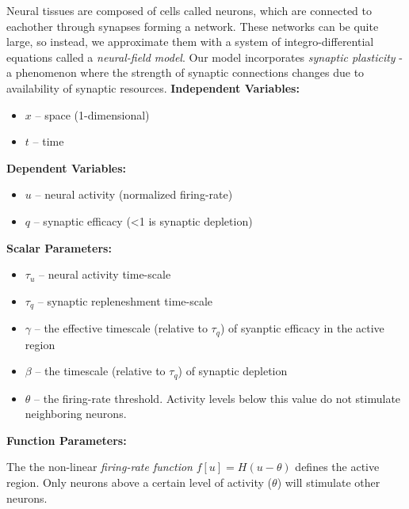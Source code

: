 \documentclass[landscape,final]{baposter}
\begin{document}
\begin{poster}

{
	Neural tissues are composed of cells called neurons, which are connected to eachother through synapses forming a network. These networks can be quite large, so instead, we approximate them with a system of integro-differential equations called a \textit{neural-field model}. Our model incorporates \textit{synaptic plasticity} - a phenomenon where the strength of synaptic connections changes due to availability of synaptic resources.
	\textbf{Independent Variables:}
	\begin{itemize}
		\item $x$ -- space (1-dimensional)
		\item $t$ -- time
	\end{itemize}
	\textbf{Dependent Variables:}
		\begin{itemize}
		\item $u$ -- neural activity (normalized firing-rate)
		\item $q$ -- synaptic efficacy (<1 is synaptic depletion)
	\end{itemize}
	\textbf{Scalar Parameters:}
		\begin{itemize}
		\item $\tau_u$ -- neural activity time-scale
		\item $\tau_q$ -- synaptic repleneshment time-scale
		\item $\gamma$ -- the effective timescale (relative to $\tau_q$) of syanptic efficacy in the active region
		\item $\beta$ -- the timescale (relative to $\tau_q$) of synaptic depletion
		\item $\theta$ -- the firing-rate threshold. Activity levels below this value do not stimulate neighboring neurons.
	\end{itemize}
	
	\textbf{Function Parameters:}
	
	The the non-linear \textit{firing-rate function} $f[u] = H(u - \theta)$ defines the active region. Only neurons above a certain level of activity ($\theta$) will stimulate other neurons.
	\bigbreak
	
}
\end{poster}
\end{document}
